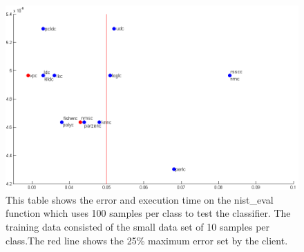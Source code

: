 \documentclass[%
        compressed,
        final,
        notitlepage,
        narroweqnarray,
        inline,
        twoside,
        ]{ieee}
\begin{document}
\begin{figure}[] 
    \includegraphics[scale=0.385]{images/large_data_set_tested.png}

    \caption{ This table shows the error and execution time on the nist\_eval
    function which uses 100 samples per class to test the classifier. The
training data consisted of the small data set of 10 samples per class.The
        red line shows the 25\% maximum error set by the client. }
    \label{fig:test-large}
\end{figure}
\end{document}
